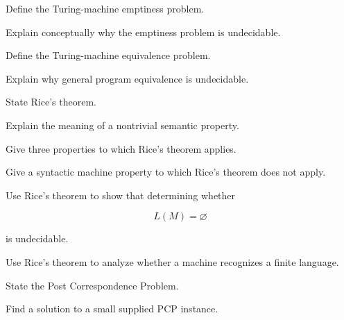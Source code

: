 \begin{exercise}[2]
Define the Turing-machine emptiness problem.
\end{exercise}

\begin{exercise}[3]
Explain conceptually why the emptiness problem is undecidable.
\end{exercise}

\begin{exercise}[2]
Define the Turing-machine equivalence problem.
\end{exercise}

\begin{exercise}[3]
Explain why general program equivalence is undecidable.
\end{exercise}

\begin{exercise}[2]
State Rice's theorem.
\end{exercise}

\begin{exercise}[3]
Explain the meaning of a nontrivial semantic property.
\end{exercise}

\begin{exercise}[3]
Give three properties to which Rice's theorem applies.
\end{exercise}

\begin{exercise}[3]
Give a syntactic machine property to which Rice's theorem does not apply.
\end{exercise}

\begin{exercise}[3]
Use Rice's theorem to show that determining whether

\[
L(M)=\varnothing
\]

is undecidable.
\end{exercise}

\begin{exercise}[3]
Use Rice's theorem to analyze whether a machine recognizes a finite
language.
\end{exercise}

\begin{exercise}[2]
State the Post Correspondence Problem.
\end{exercise}

\begin{exercise}[2]
Find a solution to a small supplied PCP instance.
\end{exercise}

